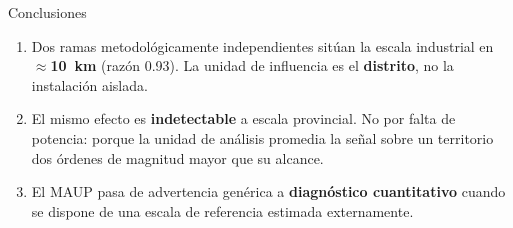 \documentclass[11pt,aspectratio=169]{beamer}
\begin{document}
\begin{frame}{Conclusiones}

\vspace{2mm}
\begin{enumerate}
  \item[\textbf{1}] Dos ramas metodológicamente independientes sitúan la
  escala industrial en \textbf{$\approx$\SI{10}{\kilo\metre}} (razón
  \num{0.93}). La unidad de influencia es el \textbf{distrito}, no la
  instalación aislada.

  \vspace{3mm}
  \item[\textbf{2}] El mismo efecto es \textbf{indetectable} a escala
  provincial. No por falta de potencia: porque la unidad de análisis promedia
  la señal sobre un territorio dos órdenes de magnitud mayor que su alcance.

  \vspace{3mm}
  \item[\textbf{3}] El MAUP pasa de advertencia genérica a
  \textbf{diagnóstico cuantitativo} cuando se dispone de una escala de
  referencia estimada externamente.
\end{enumerate}

\vspace{3mm}
\begin{center}
\end{center}

\end{frame}
\end{document}
